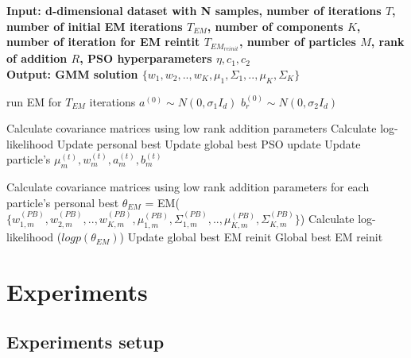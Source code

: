 \documentclass[a4paper]{article}
\begin{document}
\begin{algorithm}
    \caption{}\label{alg:cap}
    \hspace*{\algorithmicindent} \textbf{Input: d-dimensional dataset with N samples, number of iterations $T$, number of initial EM iterations $T_{EM}$, 
    number of components $K$, number of iteration for EM reintit $T_{EM_{reinit{}}}$, number of particles $M$, rank of addition $R$,
    PSO hyperparameters $\eta, c_1, c_2$} \\
    \hspace*{\algorithmicindent} \textbf{Output: GMM solution $\{w_1, w_2, .., w_K, \mu_1, \Sigma_1, .., \mu_K, \Sigma_K\}$} 
    \begin{algorithmic}
    \State run EM for $T_{EM}$ iterations
        \State $a^{(0)}\sim N(0, \sigma_1I_d)$ 
            \State $b^{(0)}_r \sim N(0, \sigma_2 I_d)$
        \EndFor
    \EndFor
    
            \State Calculate covariance matrices using low rank addition parameters
            \State Calculate log-likelihood
            \State Update personal best
         \EndFor
         \State Update global best
          \Comment PSO update
            \State Update particle's $\mu_m^{(t)}, w_m^{(t)}, a_m^{(t)}, b_m^{(t)}$
         \EndFor
     \EndFor
     
      
        \State Calculate covariance matrices using low rank addition parameters for each particle's personal best
        \State $\theta_{EM}$ = EM($\{w_{1, m}^{(PB)}, w_{2, m}^{(PB)}, .., w_{K, m}^{(PB)}, \mu_{1, m}^{(PB)}, \Sigma_{1, m}^{(PB)}, .., \mu_{K, m}^{(PB)}, \Sigma_{K, m}^{(PB)}\}$) 
        \State Calculate log-likelihood ($logp(\theta_{EM})$)
     \EndFor
     \State Update global best EM reinit
     \State \Return Global best EM reinit
    \end{algorithmic}
\end{algorithm}

\section{Experiments}

\subsection{Experiments setup}
\end{document}
